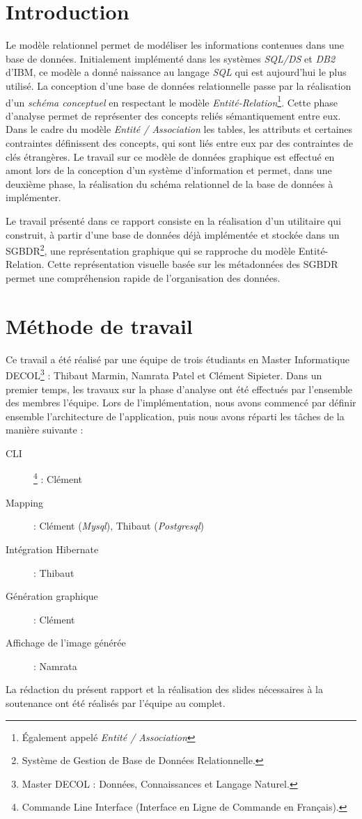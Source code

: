\chapter*{Introduction}
Le modèle relationnel permet de modéliser les informations contenues dans une base de données. Initialement implémenté dans les systèmes \emph{SQL/DS} et \emph{DB2} d'IBM, ce modèle a donné naissance au langage \emph{SQL} qui est aujourd'hui le plus utilisé. La conception d'une base de données relationnelle passe par la réalisation d'un \emph{schéma conceptuel} en respectant le modèle  \emph{Entité-Relation}\footnote{Également appelé \emph{Entité / Association}}. Cette phase d'analyse permet de représenter des concepts reliés sémantiquement entre eux. Dans le cadre du modèle \emph{Entité / Association} les tables, les attributs et certaines contraintes définissent des concepts, qui sont liés entre eux par des contraintes de clés étrangères. Le travail sur ce modèle de données graphique est effectué en amont lors de la conception d'un système d'information et permet, dans une deuxième phase, la réalisation du schéma relationnel de la base de données à implémenter.

Le travail présenté dans ce rapport consiste en la réalisation d'un utilitaire qui construit, à partir d'une base de données déjà implémentée et stockée dans un SGBDR\footnote{Système de Gestion de Base de Données Relationnelle.}, une représentation graphique qui se rapproche du modèle Entité-Relation. Cette représentation visuelle basée sur les métadonnées des SGBDR permet une compréhension rapide de l'organisation des données.

\clearemptydoublepage
\chapter*{Méthode de travail}
Ce travail a été réalisé par une équipe de trois étudiants en Master Informatique DECOL\footnote{Master DECOL : Données, Connaissances et Langage Naturel.} : Thibaut Marmin, Namrata Patel et Clément Sipieter. Dans un premier temps, les travaux sur la phase d'analyse ont été effectués par l'ensemble des membres l'équipe. Lors de l'implémentation, nous avons commencé par définir ensemble l'architecture de l'application, puis nous avons réparti les tâches de la manière suivante : 

\begin{description}
\item[CLI]\footnote{Commande Line Interface (\og Interface en Ligne de Commande \fg{} en Français).} : Clément
\item[Mapping] : Clément (\emph{Mysql}), Thibaut (\emph{Postgresql})
\item[Intégration Hibernate] : Thibaut
\item[Génération graphique] : Clément
\item[Affichage de l'image générée] : Namrata
\end{description}

La rédaction du présent rapport et la réalisation des slides nécessaires à la soutenance ont été réalisés par l'équipe au complet.
